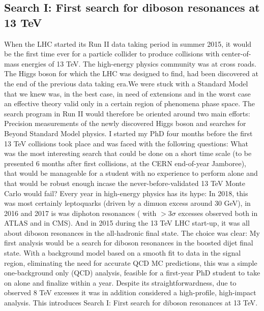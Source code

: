 \vspace*{\fill}
\begin{centering}
\section{Search I: First search for diboson resonances at 13 TeV}
When the LHC started its Run II data taking period in summer 2015, it would be the first time ever for a particle collider to produce collisions with center-of-mass energies of 13 TeV. The high-energy physics community was at cross roads. The Higgs boson for which the LHC was designed to find, had been discovered at the end of the previous data taking era.We were stuck with a Standard Model that we knew was, in the best case, in need of extensions and in the worst case an effective theory valid only in a certain region of phenomena phase space. The search program in Run II would therefore be oriented around two main efforts: Precision measurements of the newly discovered Higgs boson and searches for Beyond Standard Model physics.\newline\newline
I started my PhD four months before the first 13 TeV collisions took place and was faced with the following questions:
What was the most interesting search that could be done on a short time scale (to be presented 6 months after first collisions, at the CERN end-of-year Jamboree), that would be manageable for a student with no experience to perform alone and that would be robust enough incase the never-before-validated 13 TeV Monte Carlo would fail? \newline\newline
Every year in high-energy physics has its hype: In 2018, this was most certainly leptoquarks (driven by a dimuon excess around 30 GeV), in 2016 and 2017 is was diphoton resonances ( with  $>3\sigma$ excesses observed both in ATLAS and in CMS). And in 2015 during the 13 TeV LHC start-up, it was all about diboson resonances in the all-hadronic final state.\newline\newline
The choice was clear: My first analysis would be a search for diboson resonances in the boosted dijet final state. With a background model based on a smooth fit to data in the signal region, eliminating the need for accurate QCD MC predictions, this was a simple one-background only (QCD) analysis, feasible for a first-year PhD student to take on alone and finalize within a year. Despite its straightforwardness, due to observed 8 TeV excesses it was in addition considered a high-profile, high-impact analysis.
\newline\newline
This introduces Search I: First search for diboson resonances at 13 TeV.
\end{centering}


